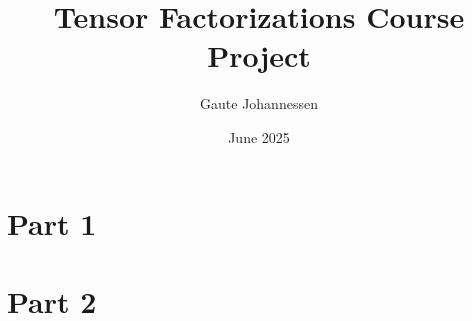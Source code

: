 \documentclass[10pt]{article}
\title{Tensor Factorizations Course Project}
\author{Gaute Johannessen}
\date{June 2025}
\begin{document}
\maketitle
\section{Part 1}



\section{Part 2}
\end{document}
